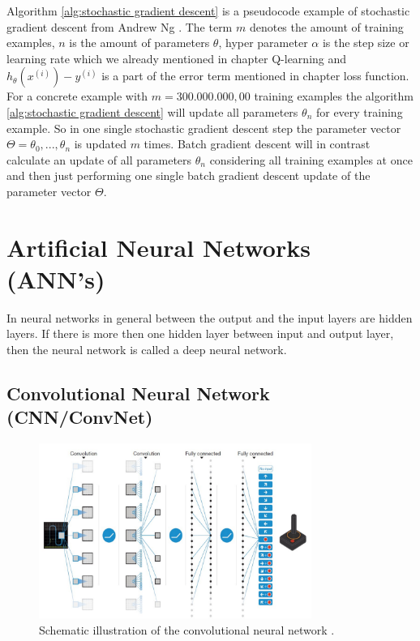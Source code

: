 \documentclass[conference]{IEEEtran}
\begin{document}
Algorithm \ref{alg:stochastic gradient descent} is a pseudocode example of stochastic gradient descent from Andrew Ng \cite{ng_2017}. The term $m$ denotes the amount of training examples, $n$ is the amount of parameters $\theta$, hyper parameter $\alpha$ is the step size or learning rate which we already mentioned in chapter Q-learning and $h_\theta(x^{(i)}) - y^{(i)}$ is a part of the error term mentioned in chapter loss function. For a concrete example with $m = 300.000.000,00$ training examples the algorithm \ref{alg:stochastic gradient descent} will update all parameters $\theta_n$ for every training example. So in one single stochastic gradient descent step the parameter vector $\Theta = \theta_0, ..., \theta_n$ is updated $m$ times. Batch gradient descent will in contrast calculate an update of all parameters $\theta_n$ considering all training examples at once and then just performing one single batch gradient descent update of the parameter vector $\Theta$.

\section{Artificial Neural Networks (ANN's)}
In neural networks in general between the output and the input layers are hidden layers. If there is more then one hidden layer between input and output layer, then the neural network is called a deep neural network.

\subsection{Convolutional Neural Network (CNN/ConvNet)}

\begin{figure}[!t]
\centering
\includegraphics[width=3.5in]{conv_net}
\caption{Schematic illustration of the convolutional neural network \cite{DRL:HumanLevelControl}.}
\label{fig:conv_net}
\end{figure}
\end{document}
